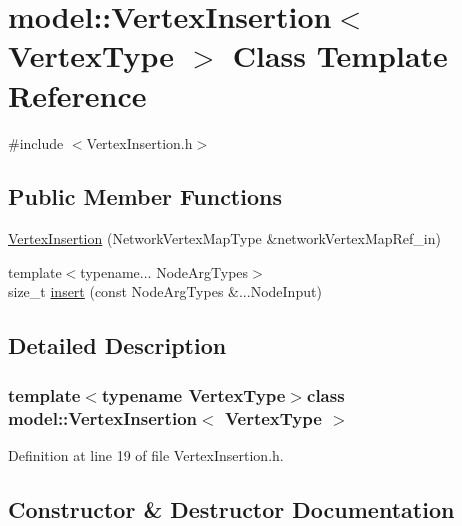 \hypertarget{classmodel_1_1_vertex_insertion}{}\section{model\+:\+:Vertex\+Insertion$<$ Vertex\+Type $>$ Class Template Reference}
\label{classmodel_1_1_vertex_insertion}


{\ttfamily \#include $<$Vertex\+Insertion.\+h$>$}

\subsection*{Public Member Functions}
\begin{DoxyCompactItemize}
\item 
\hyperlink{classmodel_1_1_vertex_insertion_a3b701e8a61e1e1a6df0f9e4447933b24}{Vertex\+Insertion} (Network\+Vertex\+Map\+Type \&network\+Vertex\+Map\+Ref\+\_\+in)
\item 
{\footnotesize template$<$typename... Node\+Arg\+Types$>$ }\\size\+\_\+t \hyperlink{classmodel_1_1_vertex_insertion_a80f0a3594feb7815c2258aa0b04f36c6}{insert} (const Node\+Arg\+Types \&...Node\+Input)
\end{DoxyCompactItemize}


\subsection{Detailed Description}
\subsubsection*{template$<$typename Vertex\+Type$>$class model\+::\+Vertex\+Insertion$<$ Vertex\+Type $>$}



Definition at line 19 of file Vertex\+Insertion.\+h.



\subsection{Constructor \& Destructor Documentation}
\hypertarget{classmodel_1_1_vertex_insertion_a3b701e8a61e1e1a6df0f9e4447933b24}{}

